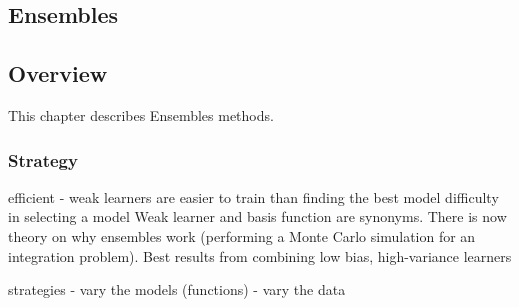 

\renewcommand{\bibsection}{\subsection{\bibname}}
\begin{bibunit}

\chapter{Ensembles}
\label{ch:ensembles}

\section{Overview}
This chapter describes Ensembles methods.


\subsection{Strategy}


efficient - weak learners are easier to train than finding the best model
difficulty in selecting a model
Weak learner and basis function are synonyms.
There is now theory on why ensembles work (performing a Monte Carlo simulation for an integration problem).
Best results from combining low bias, high-variance learners

strategies
- vary the models (functions)
- vary the data




\end{bibunit}
